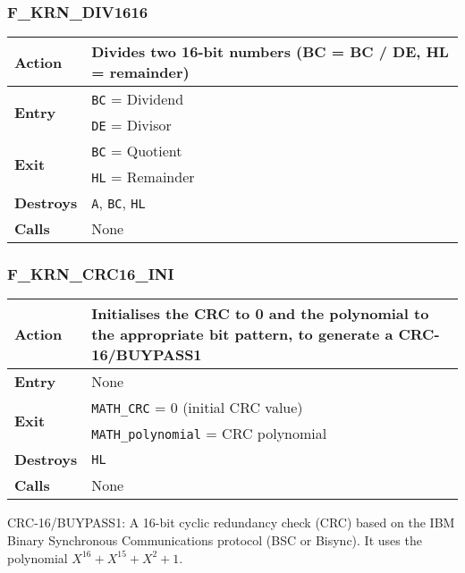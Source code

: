    \subsubsection{F\_KRN\_DIV1616}
    \label{func:fkrndiv1616}
    \begin{tabular}{l p{9cm}}
        \hline\textbf{Action}
        & Divides two 16-bit numbers (BC = BC / DE, HL = remainder)\\
        \hline\multirow[t]{2}{4em}{\textbf{Entry}}
        & \texttt{BC} = Dividend\\
        & \texttt{DE} = Divisor\\
        \hline\multirow[t]{2}{4em}{\textbf{Exit}}
        & \texttt{BC} = Quotient\\
        & \texttt{HL} = Remainder\\
        \hline\textbf{Destroys} & \texttt{A}, \texttt{BC}, \texttt{HL} \\
        \hline\textbf{Calls} & None\\
        \hline
    \end{tabular}

    \subsubsection{F\_KRN\_CRC16\_INI}
    \label{func:fkrncrc16ini}
    \begin{tabular}{l p{9cm}}
        \hline\textbf{Action}
        & Initialises the CRC to 0 and the polynomial to the appropriate bit
        pattern, to generate a CRC-16/BUYPASS1\\
        \hline\textbf{Entry} & None \\
        \hline\multirow[t]{2}{4em}{\textbf{Exit}}
        & \texttt{MATH\_CRC} = 0 (initial CRC value)\\
        & \texttt{MATH\_polynomial} = CRC polynomial\\
        \hline\textbf{Destroys} & \texttt{HL} \\
        \hline\textbf{Calls} & None\\
        \hline
    \end{tabular}

    CRC-16/BUYPASS1: A 16-bit cyclic redundancy check (CRC) based on the IBM
    Binary Synchronous Communications protocol (BSC or Bisync). It uses the
    polynomial $X^{16} + X^{15} +X^2 + 1$.

